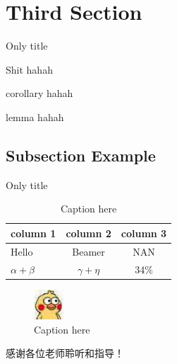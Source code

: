\documentclass[12pt]{beamer}
\begin{document}
\section{Third Section}
\begin{frame}{Only title}
	\begin{alertblock}{Shit}
		hahah
	\end{alertblock}

	\begin{corollary}{corollary}
		hahah
	\end{corollary}
	
	\begin{lemma}{lemma}
		hahah
	\end{lemma}
\end{frame}

\subsection{Subsection Example}
\begin{frame}{Only title}
	\begin{table}[tb]
	\centering
	\caption{Caption here\label{tab1}}
		\begin{tabular}{l|cc} \hline
			\textbf{column 1} & \textbf{column 2} & \textbf{column 3} \\ \hline
			Hello & Beamer & NAN \\ \hline
			$\alpha+\beta$ & $\gamma+\eta$ & 34\% \\ \hline
		\end{tabular}
	\end{table}

	\begin{figure}[tb]
		\centering
		\includegraphics[width=0.1\textwidth]{./pic/1.jpg}
		\caption{Caption here\label{fig1}}
	\end{figure}

\end{frame}

\begin{frame}
\Huge{
	\centerline{
		感谢各位老师聆听和指导！
	}
}
\end{frame}
\end{document}
